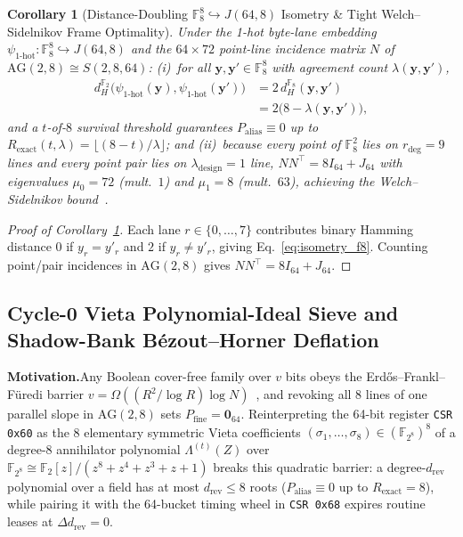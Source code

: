 \documentclass[11pt,letterpaper]{article}
\theoremstyle{spectralthm}
\newtheorem{corollary}[theorem]{Corollary}
\begin{document}
\begin{corollary}[Distance-Doubling $\mathbb{F}_8^8 \hookrightarrow J(64,8)$ Isometry \& Tight Welch--Sidelnikov Frame Optimality]
\label{cor:frame}
Under the 1-hot byte-lane embedding $\psi_{\text{1-hot}} : \mathbb{F}_8^8 \hookrightarrow J(64,8)$ and the $64 \times 72$ point-line incidence matrix $N$ of $\mathrm{AG}(2,8) \cong S(2,8,64)$:
(i)~for all $\mathbf{y}, \mathbf{y}' \in \mathbb{F}_8^8$ with agreement count $\lambda(\mathbf{y},\mathbf{y}')$,
\begin{equation}
\label{eq:isometry_f8}
\begin{aligned}
d_H^{\mathbb{F}_2}\bigl(\psi_{\text{1-hot}}(\mathbf{y}), \psi_{\text{1-hot}}(\mathbf{y}')\bigr)
&= 2\,d_H^{\mathbb{F}_8}(\mathbf{y}, \mathbf{y}')\\
&= 2\bigl(8 - \lambda(\mathbf{y}, \mathbf{y}')\bigr),
\end{aligned}
\end{equation}
and a $t$-of-$8$ survival threshold guarantees $P_{\mathrm{alias}} \equiv 0$ up to $R_{\mathrm{exact}}(t,\lambda) = \lfloor (8 - t)/\lambda \rfloor$; and
(ii)~because every point of $\mathbb{F}_8^2$ lies on $r_{\mathrm{deg}} = 9$ lines and every point pair lies on $\lambda_{\mathrm{design}} = 1$ line, $N N^\top = 8 I_{64} + J_{64}$ with eigenvalues $\mu_0 = 72$ (mult.\ $1$) and $\mu_1 = 8$ (mult.\ $63$), achieving the Welch--Sidelnikov bound~\cite{welch1974lower}.
\end{corollary}
\begin{proof}[Proof of Corollary~\ref{cor:frame}]
Each lane $r \in \{0,\ldots,7\}$ contributes binary Hamming distance $0$ if $y_r = y'_r$ and $2$ if $y_r \neq y'_r$, giving Eq.~\eqref{eq:isometry_f8}. Counting point/pair incidences in $\mathrm{AG}(2,8)$ gives $N N^\top = 8 I_{64} + J_{64}$.
\end{proof}

\subsection{Cycle-0 Vieta Polynomial-Ideal Sieve and Shadow-Bank B\'{e}zout--Horner Deflation}
\label{sec:vieta}
\noindent\textbf{Motivation.}\;Any Boolean cover-free family over $v$ bits obeys the Erd\H{o}s--Frankl--F\"{u}redi barrier $v = \Omega((R^2 / \log R)\log N)$~\cite{erdos1985families}, and revoking all 8 lines of one parallel slope in $\mathrm{AG}(2,8)$ sets $P_{\mathrm{fine}} = \mathbf{0}_{64}$. Reinterpreting the 64-bit register \texttt{CSR 0x60} as the 8 elementary symmetric Vieta coefficients $(\sigma_1,\ldots,\sigma_8) \in (\mathbb{F}_{2^8})^8$ of a degree-8 annihilator polynomial $\Lambda^{(t)}(Z)$ over $\mathbb{F}_{2^8} \cong \mathbb{F}_2[z]/(z^8 + z^4 + z^3 + z + 1)$ breaks this quadratic barrier: a degree-$d_{\mathrm{rev}}$ polynomial over a field has at most $d_{\mathrm{rev}} \le 8$ roots ($P_{\mathrm{alias}} \equiv 0$ up to $R_{\mathrm{exact}} = 8$), while pairing it with the 64-bucket timing wheel in \texttt{CSR 0x68} expires routine leases at $\Delta d_{\mathrm{rev}} = 0$.\par\smallskip
\end{document}

